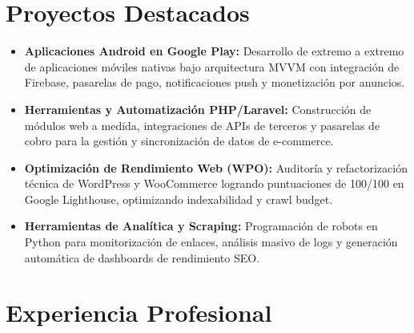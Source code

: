 \documentclass[10pt,a4paper]{article}
\begin{document}
\section{Proyectos Destacados}
\begin{itemize}
  \item \textbf{Aplicaciones Android en Google Play:} Desarrollo de extremo a extremo de aplicaciones móviles nativas bajo arquitectura MVVM con integración de Firebase, pasarelas de pago, notificaciones push y monetización por anuncios.
  \item \textbf{Herramientas y Automatización PHP/Laravel:} Construcción de módulos web a medida, integraciones de APIs de terceros y pasarelas de cobro para la gestión y sincronización de datos de e-commerce.
  \item \textbf{Optimización de Rendimiento Web (WPO):} Auditoría y refactorización técnica de WordPress y WooCommerce logrando puntuaciones de 100/100 en Google Lighthouse, optimizando indexabilidad y crawl budget.
  \item \textbf{Herramientas de Analítica y Scraping:} Programación de robots en Python para monitorización de enlaces, análisis masivo de logs y generación automática de dashboards de rendimiento SEO.
\end{itemize}

\section{Experiencia Profesional}

\end{document}
